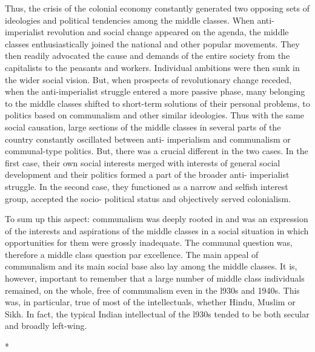 \begin{multicols}{2}
Thus, the crisis of the colonial economy constantly generated two opposing sets of ideologies and political tendencies among the middle classes. When anti-imperialist revolution and social change appeared on the agenda, the middle classes enthusiastically joined the national and other popular movements. They then readily advocated the cause and demands of the entire society from the capitalists to the peasants and workers. Individual ambitions were then sunk in the wider social vision. But, when prospects of revolutionary change receded, when the anti-imperialist struggle entered a more passive phase, many belonging to the middle classes shifted to short-term solutions of their personal problems, to politics based on communalism and other similar ideologies. Thus with the same social causation, large sections of the middle classes in several parts of the country constantly oscillated between anti- imperialism and communalism or communal-type politics. But, there was a crucial different in the two cases. In the first case, their own social interests merged with interests of general social development and their politics formed a part of the broader anti- imperialist struggle. In the second case, they functioned as a narrow and selfish interest group, accepted the socio- political status and objectively served colonialism. 

To sum up this aspect: communalism was deeply rooted in and was an expression of the interests and aspirations of the middle classes in a social situation in which opportunities for them were grossly inadequate. The communal question was, therefore a middle class question par excellence. The main appeal of communalism and its main social base also lay among the middle classes. It is, however, important to remember that a large number of middle class individuals remained, on the whole, free of communalism even in the l930s and 1940s. This was, in particular, true of most of the intellectuals, whether Hindu, Muslim or Sikh. In fact, the typical Indian intellectual of the l930s tended to be both secular and broadly left-wing.

\begin{center}*\end{center}

\paragraph*{}


\end{multicols}
